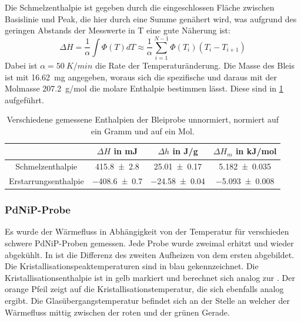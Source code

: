 \documentclass[
	a4paper,
	12pt,
	pagesize,
	ngerman
]{scrartcl}
\begin{document}
	Die Schmelzenthalpie ist gegeben durch die eingeschlossen Fläche zwischen Basislinie und Peak, die hier durch eine Summe genähert wird, was aufgrund des geringen Abstands der Messwerte in T eine gute Näherung ist:
	\begin{equation}
			\label{eq_enth}
			\Delta H = \frac{1}{\alpha} \int \Phi(T) dT \approx \frac{1}{\alpha} \sum_{i=1}^{N-1} \Phi(T_i) (T_i-T_{i+1})
	\end{equation}
	Dabei ist $\alpha=\SI{50}{K/min}$ die Rate der Temperaturänderung.
	Die Masse des Bleis ist mit \SI{16.62}{mg} angegeben, woraus sich die spezifische und daraus mit der Molmasse \SI{207.2}{g/mol} die molare Enthalpie bestimmen lässt. %
	Diese sind in \cref{tb_enthal_blei} aufgeführt.
\begin{table}[H]
		\centering
		\begin{tabular}{c | c | c | c  }
			 &$\Delta H$ in \si{mJ}& $\Delta h$ in \si{J/g} &$\Delta H_m$ in \si{kJ/mol}\\ \hline
			 Schmelzenthalpie& \SI{415.8+-2.8}{}&\SI{25.01+-0.17}{}& \SI{5.182+-0.035}{} \\
			 Erstarrungsenthalpie&\SI{-408.6+-0.7}{}&\SI{-24.58+-0.04}{}&\SI{-5.093+-0.008}{} \\
		\end{tabular}
		\caption{
		Verschiedene gemessene Enthalpien der Bleiprobe unnormiert, normiert auf ein Gramm und auf ein Mol.
		}
		\label{tb_enthal_blei}
\end{table}
	\subsubsection*{PdNiP-Probe}
	Es wurde der Wärmefluss in Abhängigkeit von der Temperatur für verschieden schwere PdNiP-Proben gemessen.
	Jede Probe wurde zweimal erhitzt und wieder abgekühlt.
	In  ist die Differenz des zweiten Aufheizen von dem ersten abgebildet.
	Die Kristallisationspeaktemperaturen sind in blau gekennzeichnet.
	Die Kristallisationsenthalpie ist in gelb markiert und berechnet sich analog zur .
	Der orange Pfeil zeigt auf die Kristallisationstemperatur, die sich ebenfalls analog ergibt.
	Die Glasübergangstemperatur befindet sich an der Stelle an welcher der Wärmefluss mittig zwischen der roten und der grünen Gerade.
\end{document}
